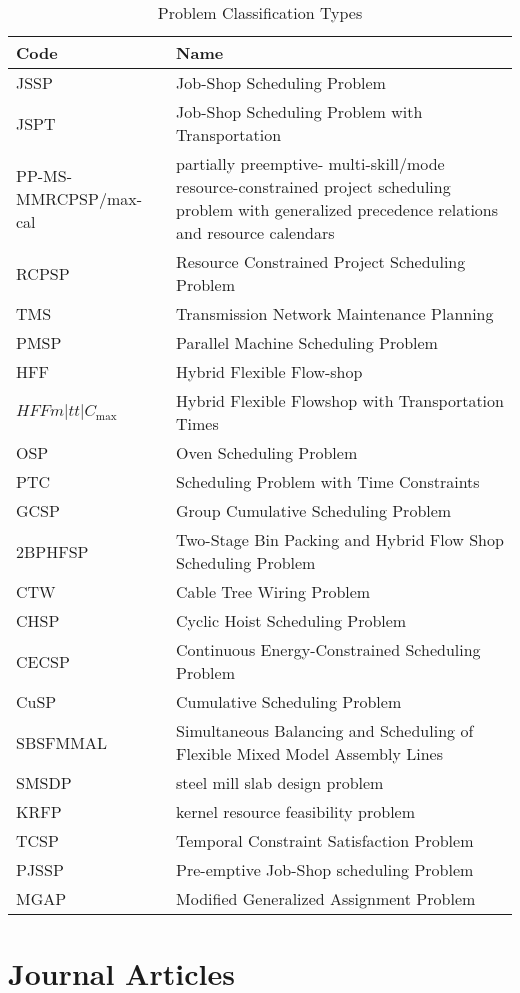 \documentclass[a4paper]{article}
\begin{document}
\begin{table}[htbp]
\caption{\label{tab:classification}Problem Classification Types}
\begin{tabular}{lp{8cm}}\toprule
Code & Name \\ \midrule
JSSP & Job-Shop Scheduling Problem \\
JSPT & Job-Shop Scheduling Problem with Transportation \\
PP-MS-MMRCPSP/max-cal & partially preemptive- multi-skill/mode resource-constrained project scheduling problem with generalized precedence relations and resource calendars\\
RCPSP & Resource Constrained Project Scheduling Problem \\
TMS & Transmission Network Maintenance Planning \\
PMSP & Parallel Machine Scheduling Problem\\
HFF & Hybrid Flexible Flow-shop \\
$HFFm|tt|C_{\max}$ & Hybrid Flexible Flowshop with Transportation Times\\
OSP & Oven Scheduling Problem \\
PTC & Scheduling Problem with Time Constraints\\
GCSP & Group Cumulative Scheduling Problem \\
2BPHFSP & Two-Stage Bin Packing and Hybrid Flow Shop Scheduling Problem\\
CTW & Cable Tree Wiring Problem\\
CHSP & Cyclic Hoist Scheduling Problem \\
CECSP & Continuous Energy-Constrained Scheduling Problem \\
CuSP & Cumulative Scheduling Problem \\
SBSFMMAL & Simultaneous Balancing and Scheduling of Flexible Mixed Model Assembly Lines\\
SMSDP & steel mill slab design problem \\
KRFP & kernel resource feasibility problem\\
TCSP & Temporal Constraint Satisfaction Problem\\
PJSSP & Pre-emptive Job-Shop scheduling Problem\\
MGAP & Modified Generalized Assignment Problem\\
\bottomrule
\end{tabular}
\end{table}

\section{Journal Articles}
\end{document}
